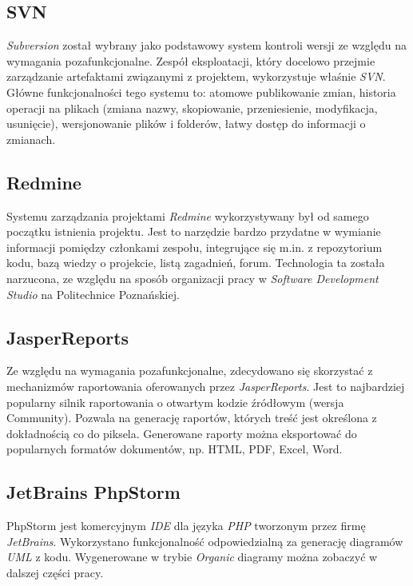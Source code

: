 \subsection{SVN}
\label{Chapter632}

\emph{Subversion} został wybrany jako podstawowy system kontroli wersji ze względu na wymagania pozafunkcjonalne. Zespół eksploatacji, który docelowo przejmie zarządzanie artefaktami związanymi z projektem, wykorzystuje właśnie \textit{SVN}. Główne funkcjonalności tego systemu to: atomowe publikowanie zmian, historia operacji na plikach (zmiana nazwy, skopiowanie, przeniesienie, modyfikacja, usunięcie), wersjonowanie plików i folderów, łatwy dostęp do informacji o zmianach.

\subsection{Redmine}
\label{Chapter633}

Systemu zarządzania projektami \emph{Redmine} wykorzystywany był od samego początku istnienia projektu. Jest to narzędzie bardzo przydatne w wymianie informacji pomiędzy członkami zespołu, integrujące się m.in. z repozytorium kodu, bazą wiedzy o projekcie, listą zagadnień, forum.  Technologia ta została narzucona, ze względu na sposób organizacji pracy w \textit{Software Development Studio} na Politechnice Poznańskiej.

\subsection{JasperReports}
\label{Chapter634}

Ze względu na wymagania pozafunkcjonalne, zdecydowano się skorzystać z mechanizmów raportowania oferowanych przez \emph{JasperReports}. Jest to najbardziej popularny silnik raportowania o otwartym kodzie źródłowym (wersja Community). Pozwala na generację raportów, których treść jest określona z dokładnością co do piksela. Generowane raporty można eksportować do popularnych formatów dokumentów, np. HTML, PDF, Excel, Word.

\subsection{JetBrains PhpStorm}
\label{Chapter635}

PhpStorm jest komercyjnym \emph{IDE} dla języka \emph{PHP} tworzonym przez firmę \emph{JetBrains}. Wykorzystano funkcjonalność odpowiedzialną za generację diagramów \emph{UML} z kodu. Wygenerowane w trybie \emph{Organic} diagramy można zobaczyć w dalszej części pracy.